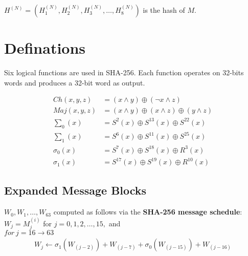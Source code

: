 \documentclass{report}
\begin{document}
$ H^{(N)} = \left( H_{1}^{(N)}, H_{2}^{(N)}, H_{3}^{(N)}, \ldots, H_{8}^{(N)} \right)  $ is the hash of $M$.
\section{Definations}
Six logical functions are used in SHA-256. Each function operates on 32-bits words and produces a 32-bit word as output.

\begin{align}
	Ch(x,y,z)       &= (x \wedge y) \oplus (\neg x \wedge z)\\
	Maj(x,y,z)      &= (x \wedge y) \oplus (x \wedge z) \oplus (y \wedge z) \\
	\sum_{0}{(x)}   &= S^{2}(x)     \oplus S^{13}(x)    \oplus S^{22}(x) \\
	\sum_{1}{(x)}   &= S^{6}(x)     \oplus S^{11}(x)    \oplus S^{25}(x) \\
	\sigma_{0}{(x)} &= S^{7}(x)     \oplus S^{18}(x)    \oplus R^{3}(x) \\
	\sigma_{1}{(x)} &= S^{17}(x)    \oplus S^{19}(x)    \oplus R^{10}(x)
\end{align}

\subsection{Expanded Message Blocks}
$W_0, W_1, \ldots, W_{63}$ computed as follows via the \textbf{SHA-256 message schedule}: \\
$ W_{j} = M_{j}^{(i)}$ for $j = 0, 1, 2, \ldots, 15,$ and \\
$for\ j = 16 \rightarrow 63$ 
\begin{align*}
	W_{j} \leftarrow \sigma_{1}(W_{(j - 2)}) + W_{(j - 7)} + \sigma_{0}(W_{(j - 15)}) + W_{(j - 16)}
\end{align*}
\end{document}
